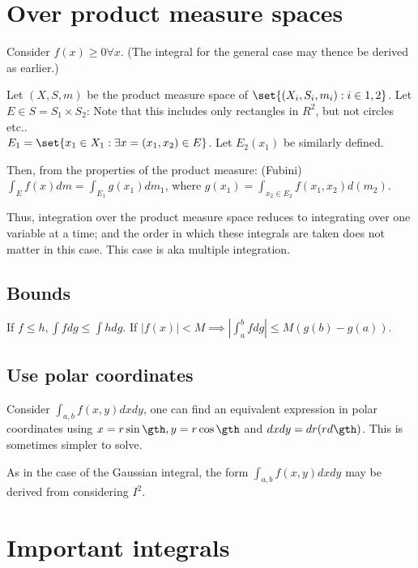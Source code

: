 \documentclass[oneside, article]{memoir}
\begin{document}
\section{Over product measure spaces}
Consider $f(x) \geq 0 \forall x$. (The integral for the general case may thence be derived as earlier.)

Let $(X, S, m)$ be the product measure space of $\set{(X_i, S_i, m_i) : i \in {1, 2}}$. Let $E \in S = S_1 \times S_2$: Note that this includes only rectangles in $R^{2}$, but not circles etc.. \\$E_1 = \set{x_1 \in X_1: \exists x = (x_1, x_2) \in E}$. Let $E_2(x_1)$ be similarly defined.

Then, from the properties of the product measure: (Fubini) $\int_E f(x) dm = \int_{E_1} g(x_1) dm_1$, where $g(x_1) = \int_{x_2 \in E_2} f(x_1, x_2) d(m_2)$.


Thus, integration over the product measure space reduces to integrating over one variable at a time; and the order in which these integrals are taken does not matter in this case. This case is aka multiple integration.

\subsection{Bounds}
If $f \leq h, \int f dg \leq \int h dg$. If $|f(x)| < M \implies |\int_{a}^{b} f dg| \leq M (g(b) - g(a))$.

\subsection{Use polar coordinates}
Consider $\int_{a, b} f(x, y) dx dy$, one can find an equivalent expression in polar coordinates using $x = r \sin \gth, y = r \cos \gth$ and $dxdy = dr (r d\gth)$. This is sometimes simpler to solve.

As in the case of the Gaussian integral, the form $\int_{a, b} f(x, y) dx dy$ may be derived from considering $I^2$.

\section{Important integrals}
\end{document}
